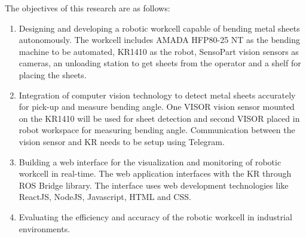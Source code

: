 The objectives of this research are as follows:
\begin{enumerate}
    \item Designing and developing a robotic workcell capable of bending metal sheets autonomously. The workcell includes AMADA HFP80-25 NT as the bending machine to be automated, KR1410 as the robot, SensoPart vision sensors as cameras, an unloading station to get sheets from the operator and a shelf for placing the sheets.
    \item Integration of computer vision technology to detect metal sheets accurately for pick-up and measure bending angle. One VISOR\textsuperscript{\textregistered} vision sensor mounted on the KR1410 will be used for sheet detection and second VISOR\textsuperscript{\textregistered} placed in robot workspace for measuring bending angle. Communication between the vision sensor and KR needs to be setup using Telegram.
    \item Building a web interface for the visualization and monitoring of robotic workcell in real-time. The web application interfaces with the KR through ROS Bridge library. The interface uses web development technologies like ReactJS, NodeJS, Javascript, HTML and CSS.
    \item Evaluating the efficiency and accuracy of the robotic workcell in industrial environments.
\end{enumerate}